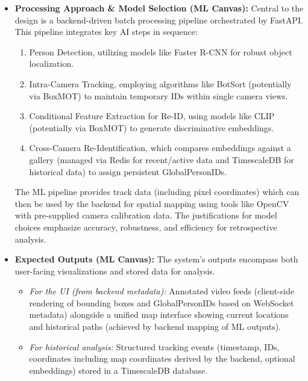 \begin{itemize}
    \item \textbf{Processing Approach \& Model Selection (ML Canvas):}
        Central to the design is a backend-driven batch processing pipeline orchestrated by FastAPI. This pipeline integrates key AI steps in sequence:
        \begin{enumerate}[label=(\Alph*)]
            \item Person Detection, utilizing models like Faster R-CNN for robust object localization.
            \item Intra-Camera Tracking, employing algorithms like BotSort (potentially via BoxMOT) to maintain temporary IDs within single camera views.
            \item Conditional Feature Extraction for Re-ID, using models like CLIP (potentially via BoxMOT) to generate discriminative embeddings.
            \item Cross-Camera Re-Identification, which compares embeddings against a gallery (managed via Redis for recent/active data and TimescaleDB for historical data) to assign persistent GlobalPersonIDs.
        \end{enumerate}
        The ML pipeline provides track data (including pixel coordinates) which can then be used by the backend for spatial mapping using tools like OpenCV with pre-supplied camera calibration data. The justifications for model choices emphasize accuracy, robustness, and efficiency for retrospective analysis.

    \item \textbf{Expected Outputs (ML Canvas):}
        The system's outputs encompass both user-facing visualizations and stored data for analysis.
        \begin{itemize}
            \item \textit{For the UI (from backend metadata):} Annotated video feeds (client-side rendering of bounding boxes and GlobalPersonIDs based on WebSocket metadata) alongside a unified map interface showing current locations and historical paths (achieved by backend mapping of ML outputs).
            \item \textit{For historical analysis:} Structured tracking events (timestamp, IDs, coordinates including map coordinates derived by the backend, optional embeddings) stored in a TimescaleDB database.
        \end{itemize}


\end{itemize}
